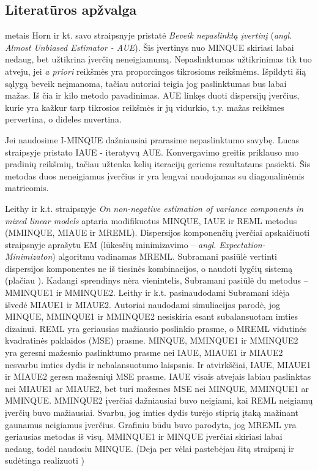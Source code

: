 \documentclass[12pt,a4paper]{article}
\begin{document}
\subsection{Literatūros apžvalga}

 metais Horn ir kt. savo straipsnyje \cite{AUE} pristatė \textit{Beveik nepaslinktą įvertinį} (\textit{angl. Almost Unbiased Estimator - AUE}). Šis įvertinys nuo MINQUE skiriasi labai nedaug, bet užtikrina įverčių neneigiamumą. Nepaslinktumas užtikrinimas tik tuo atveju, jei \textit{a priori} reikšmės yra proporcingos tikrosioms reikšmėms. Išpildyti šią sąlygą beveik neįmanoma, tačiau autoriai teigia jog paslinktumas bus labai mažas. Iš čia ir kilo metodo pavadinimas. AUE linkęs duoti dispersijų įverčius, kurie yra kažkur tarp tikrosios reikšmės ir jų vidurkio, t.y. mažas reikšmes pervertina, o dideles nuvertina.

\indent Jei naudosime I-MINQUE dažniausiai prarasime nepaslinktumo savybę. Lucas straipsyje \cite{IAUE} pristato IAUE - iteratyvų AUE. Konvergavimo greitis priklauso nuo pradinių reikšmių, tačiau užtenka kelių iteracijų geriems rezultatams pasiekti. Šis metodas duos neneigiamus įverčius ir yra lengvai naudojamas su diagonalinėmis matricomis.

\indent Leithy ir k.t. straipsnyje \textit{On non-negative estimation of variance components in mixed linear models} \cite{MMINQUE} aptaria  modifikuotus MINQUE, IAUE ir REML metodus (MMINQUE, MIAUE ir MREML). Dispersijos komponenčių įverčiai apskaičiuoti straipsnyje aprašytu EM (lūkesčių minimizavimo --  \textit{angl. Expectation-Minimizaton}) algoritmu vadinamas MREML. Subramani \cite{MMIVQUE} pasiūlė vertinti dispersijos komponentes ne iš tiesinės kombinacijos, o naudoti lygčių sistemą (plačiau \cite{MMINQUE}). Kadangi sprendinys nėra vienintelis, Subramani pasiūlė du metodus -- MMINQUE1 ir MMINQUE2. Leithy ir k.t. pasinaudodami Subramani idėja išvedė MIAUE1 ir MIAUE2. Autoriai naudodami simuliacijas parodė, jog MINQUE, MMINQUE1 ir MMINQUE2 nesiskiria esant subalansuotam imties dizainui. REML yra geriausias mažiausio poslinkio prasme, o MREML vidutinės kvadratinės paklaidos (MSE) prasme. MINQUE, MMINQUE1 ir MMINQUE2 yra geresni mažesnio paslinktumo prasme nei IAUE, MIAUE1 ir MIAUE2 nesvarbu imties dydis ir nebalansuotumo laispsnis. Ir atvirkščiai, IAUE, MIAUE1 ir MIAUE2 geresn mažesniųi MSE prasme. IAUE visais atvejais labiau paslinktas nei MIAUE1 ar MIAUE2, bet turi mažesnes MSE nei MINQUE, MMINQUE1 ar MMINQUE. MMINQUE2 įverčiai dažniausiai buvo neigiami, kai REML neigiamų įverčių buvo mažiausiai. Svarbu, jog imties dydis turėjo stiprią įtaką mažinant gaunamus neigiamus įverčius. Grafiniu būdu buvo parodyta, jog MREML yra geriausias metodas iš visų. MMINQUE1 ir MINQUE įverčiai skiriasi labai nedaug, todėl naudosiu MINQUE. (Deja per vėlai pastebėjau šitą straipsnį ir sudėtinga realizuoti )
\end{document}
